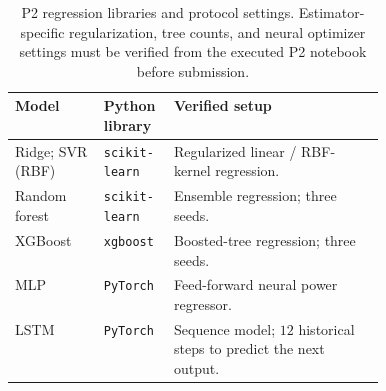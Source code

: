 \begin{table}[!htbp]\centering\footnotesize
\caption{P2 regression libraries and protocol settings. Estimator-specific regularization, tree counts, and neural optimizer settings must be verified from the executed P2 notebook before submission.}\label{tab:p2impl}
\begin{tabularx}{\linewidth}{@{}p{0.24\linewidth}p{0.19\linewidth}X@{}}\toprule
\textbf{Model} & \textbf{Python library} & \textbf{Verified setup}\\\midrule
Ridge; SVR (RBF) & \texttt{scikit-learn} & Regularized linear / RBF-kernel regression.\\
Random forest & \texttt{scikit-learn} & Ensemble regression; three seeds.\\
XGBoost & \texttt{xgboost} & Boosted-tree regression; three seeds.\\
MLP & \texttt{PyTorch} & Feed-forward neural power regressor.\\
LSTM & \texttt{PyTorch} & Sequence model; $12$ historical steps to predict the next output.\\
\bottomrule\end{tabularx}
\end{table}
